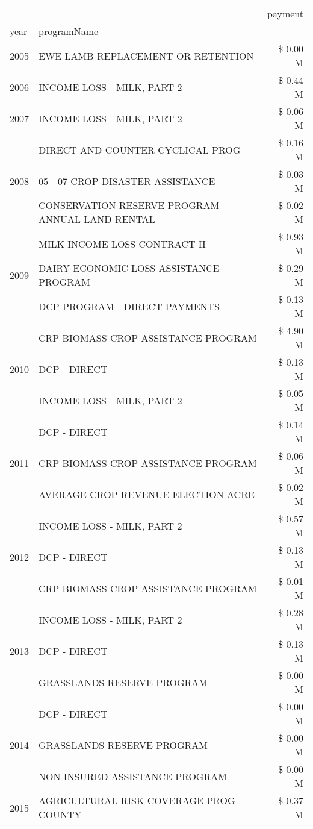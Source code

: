 \begin{tabular}{llr}
\toprule
 &  & payment \\
year & programName &  \\
\midrule
2005 & EWE LAMB REPLACEMENT OR RETENTION & \$ 0.00 M \\
\cline{1-3}
2006 & INCOME LOSS - MILK, PART 2 & \$ 0.44 M \\
\cline{1-3}
2007 & INCOME LOSS - MILK, PART 2 & \$ 0.06 M \\
\cline{1-3}
\multirow[t]{3}{*}{2008} & DIRECT AND COUNTER CYCLICAL PROG & \$ 0.16 M \\
 & 05 - 07 CROP DISASTER ASSISTANCE & \$ 0.03 M \\
 & CONSERVATION RESERVE PROGRAM - ANNUAL LAND RENTAL & \$ 0.02 M \\
\cline{1-3}
\multirow[t]{3}{*}{2009} & MILK INCOME LOSS CONTRACT II & \$ 0.93 M \\
 & DAIRY ECONOMIC LOSS ASSISTANCE PROGRAM & \$ 0.29 M \\
 & DCP PROGRAM - DIRECT PAYMENTS & \$ 0.13 M \\
\cline{1-3}
\multirow[t]{3}{*}{2010} & CRP BIOMASS CROP ASSISTANCE PROGRAM & \$ 4.90 M \\
 & DCP - DIRECT & \$ 0.13 M \\
 & INCOME LOSS - MILK, PART 2 & \$ 0.05 M \\
\cline{1-3}
\multirow[t]{3}{*}{2011} & DCP - DIRECT & \$ 0.14 M \\
 & CRP BIOMASS CROP ASSISTANCE PROGRAM & \$ 0.06 M \\
 & AVERAGE CROP REVENUE ELECTION-ACRE & \$ 0.02 M \\
\cline{1-3}
\multirow[t]{3}{*}{2012} & INCOME LOSS - MILK, PART 2 & \$ 0.57 M \\
 & DCP - DIRECT & \$ 0.13 M \\
 & CRP BIOMASS CROP ASSISTANCE PROGRAM & \$ 0.01 M \\
\cline{1-3}
\multirow[t]{3}{*}{2013} & INCOME LOSS - MILK, PART 2 & \$ 0.28 M \\
 & DCP - DIRECT & \$ 0.13 M \\
 & GRASSLANDS RESERVE PROGRAM & \$ 0.00 M \\
\cline{1-3}
\multirow[t]{3}{*}{2014} & DCP - DIRECT & \$ 0.00 M \\
 & GRASSLANDS RESERVE PROGRAM & \$ 0.00 M \\
 & NON-INSURED ASSISTANCE PROGRAM & \$ 0.00 M \\
\cline{1-3}
\multirow[t]{3}{*}{2015} & AGRICULTURAL RISK COVERAGE PROG - COUNTY & \$ 0.37 M \\

\end{tabular}
